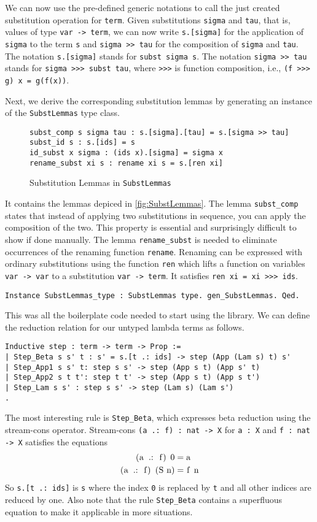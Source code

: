 \documentclass{scrartcl}
\newcommand{\lst}{\lstinline}
\begin{document}
We can now use the pre-defined generic notations to call the just created substitution operation for \lst$term$. Given substitutions \lst$sigma$ and \lst$tau$, that is, values of type \lst$var -> term$, we can now write \lst$s.[sigma]$ for the application of \lst$sigma$ to  the term \lst$s$ and \lst$sigma >> tau$ for the composition of \lst$sigma$ and \lst$tau$. 
The notation \lst$s.[sigma]$ stands for \lst$subst sigma s$. 
The notation \lst$sigma >> tau$ stands for \lst$sigma >>> subst tau$, where \lst$>>>$ is function composition, i.e., \lst$(f >>> g) x = g(f(x))$.

Next, we derive the corresponding substitution lemmas by generating an instance of the \lst$SubstLemmas$ type class.
\begin{figure}
\begin{lstlisting}
subst_comp s sigma tau : s.[sigma].[tau] = s.[sigma >> tau]
subst_id s : s.[ids] = s
id_subst x sigma : (ids x).[sigma] = sigma x
rename_subst xi s : rename xi s = s.[ren xi]
\end{lstlisting}
  \caption{Substitution Lemmas in \lst$SubstLemmas$}
  \label{fig:SubstLemmas}
\end{figure}
It contains the lemmas depiced in \autoref{fig:SubstLemmas}.
The lemma \lst$subst_comp$ states that instead of applying two substitutions in sequence, you can apply the composition of the two. This property is essential and surprisingly difficult to show if done manually. 
The lemma \lst$rename_subst$ is needed to eliminate occurrences of the renaming function \lst$rename$. Renaming can be expressed with ordinary substitutions using the function \lst$ren$ which lifts a function on variables \lst$var -> var$ to a substitution \lst$var -> term$. It satisfies \lst$ren xi = xi >>> ids$.
\begin{lstlisting}
Instance SubstLemmas_type : SubstLemmas type. gen_SubstLemmas. Qed.
\end{lstlisting}


This was all the boilerplate code needed to start using the library.
We can define the reduction relation for our untyped lambda terms as follows.
\begin{lstlisting}
Inductive step : term -> term -> Prop :=
| Step_Beta s s' t : s' = s.[t .: ids] -> step (App (Lam s) t) s'
| Step_App1 s s' t: step s s' -> step (App s t) (App s' t)
| Step_App2 s t t': step t t' -> step (App s t) (App s t')
| Step_Lam s s' : step s s' -> step (Lam s) (Lam s')
.
\end{lstlisting}
The most interesting rule is \lst$Step_Beta$, which expresses beta reduction using the stream-cons operator. Stream-cons \lst$(a .: f) : nat -> X$ for \lst$a : X$ and \lst$f : nat -> X$ satisfies the equations
\begin{align*}
  \text{\lst$(a .: f) 0$} &= \text{\lst$a$} \\
  \text{\lst$(a .: f) (S n)$} &= \text{\lst$f n$}
\end{align*}
So \lst$s.[t .: ids]$ is \lst$s$ where the index \lst$0$ is replaced by \lst$t$ and all other indices are reduced by one.
Also note that the rule \lst$Step_Beta$ contains a superfluous equation to make it applicable in more situations.
\end{document}
